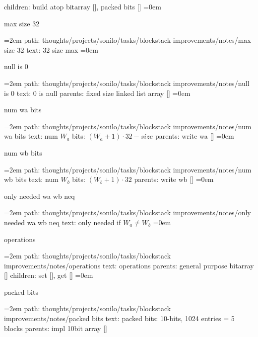 \smallskip
children: build atop bitarray [], packed bits []
\smallskip
\leftskip=0em
\par\endgroup
\bigskip
{}
max size 32
\smallskip
\par\begingroup
\leftskip=2em
path: thoughts/projects/sonilo/tasks/blockstack improvements/notes/max size 32
\smallskip
text:  32 size max
\smallskip
\leftskip=0em
\par\endgroup
\bigskip
{}
null is 0
\smallskip
\par\begingroup
\leftskip=2em
path: thoughts/projects/sonilo/tasks/blockstack improvements/notes/null is 0
\smallskip
text:  0 is null
\smallskip
parents:  fixed size linked list array []
\smallskip
\leftskip=0em
\par\endgroup
\bigskip
{}
num wa bits
\smallskip
\par\begingroup
\leftskip=2em
path: thoughts/projects/sonilo/tasks/blockstack improvements/notes/num wa bits
\smallskip
text:  num $W_a$ bits: $(W_a + 1)\cdot 32 - size$
\smallskip
parents:  write wa []
\smallskip
\leftskip=0em
\par\endgroup
\bigskip
{}
num wb bits
\smallskip
\par\begingroup
\leftskip=2em
path: thoughts/projects/sonilo/tasks/blockstack improvements/notes/num wb bits
\smallskip
text:  num $W_b$ bits: $(W_b + 1)\cdot 32$
\smallskip
parents:  write wb []
\smallskip
\leftskip=0em
\par\endgroup
\bigskip
{}
only needed wa wb neq
\smallskip
\par\begingroup
\leftskip=2em
path: thoughts/projects/sonilo/tasks/blockstack improvements/notes/only needed wa wb neq
\smallskip
text:  only needed if $W_a \neq W_b$
\smallskip
\leftskip=0em
\par\endgroup
\bigskip
{}
operations
\smallskip
\par\begingroup
\leftskip=2em
path: thoughts/projects/sonilo/tasks/blockstack improvements/notes/operations
\smallskip
text:  operations
\smallskip
parents:  general purpose bitarray []
\smallskip
children: set [], get []
\smallskip
\leftskip=0em
\par\endgroup
\bigskip
{}
packed bits
\smallskip
\par\begingroup
\leftskip=2em
path: thoughts/projects/sonilo/tasks/blockstack improvements/notes/packed bits
\smallskip
text:  packed bits: 10-bits, 1024 entries = 5 blocks
\smallskip
parents:  impl 10bit array []
